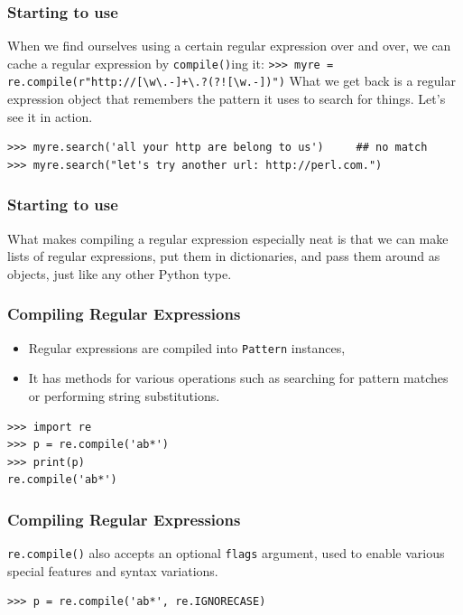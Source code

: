  \begin{frame}[fragile]
\frametitle{Starting to use}
When we find ourselves using a certain regular expression over and
over, we can cache a regular expression by \lstinline{compile()}ing it: \lstinline|>>> myre = re.compile(r"http://[\w\.-]+\.?(?![\w.-])")|
What we get back is a regular expression object that remembers the
pattern it uses to search for things.  Let's see it in action.
\begin{lstlisting}
>>> myre.search('all your http are belong to us')     ## no match
>>> myre.search("let's try another url: http://perl.com.")
\end{lstlisting}

\end{frame}

 \begin{frame}[fragile]
\frametitle{Starting to use}
What makes compiling a regular expression especially neat is that we
can make lists of regular expressions, put them in dictionaries, and
pass them around as objects, just like any other Python type.
\end{frame}


 \begin{frame}[fragile]
\frametitle{Compiling Regular Expressions } 

\begin{itemize}
\item Regular expressions are compiled into \lstinline|Pattern| instances,
\item It has methods for various operations such as searching for
pattern matches or performing string substitutions.
\end{itemize}
\begin{lstlisting}
>>> import re
>>> p = re.compile('ab*')
>>> print(p)
re.compile('ab*')
\end{lstlisting}
\end{frame}

 \begin{frame}[fragile]
\frametitle{Compiling Regular Expressions } 
 \lstinline{re.compile()} also accepts an optional \lstinline{flags}
argument, used to enable various special features and syntax
variations.  

\begin{lstlisting}
>>> p = re.compile('ab*', re.IGNORECASE)
\end{lstlisting}
\end{frame}

